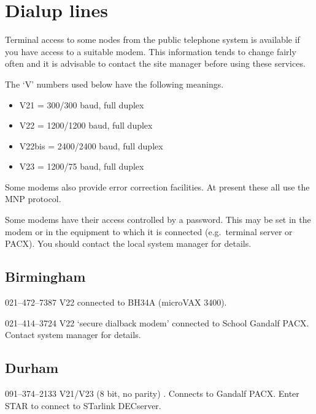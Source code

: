 \section{Dialup lines}

Terminal access to some nodes from the public telephone system is available if
you have access to a suitable modem. This information tends to change fairly
often and it is advisable to contact the site manager before using these
services.

The `V' numbers used below have the following meanings.
\begin{itemize}
\item V21 = 300/300 baud, full duplex
\item V22 = 1200/1200 baud, full duplex
\item V22bis = 2400/2400 baud, full duplex
\item V23 = 1200/75 baud, full duplex
\end{itemize}
Some modems also provide error correction facilities. At present these all use
the MNP protocol.

Some modems have their access controlled by a password. This may be set in the
modem or in the equipment to which it is connected (e.g.\ terminal server or
PACX). You should contact the local system manager for details.
\newlength{\numlen}
\settowidth{\numlen}{xxxx000--000--0000}
\settowidth{\labelsep}{000}

\subsection{Birmingham}
\begin{list}{}{\setlength{\labelwidth}{\numlen}\setlength{\leftmargin}{\numlen}
\addtolength{\leftmargin}{\labelsep}}
\item[021--472--7387] V22 connected to BH34A (microVAX 3400).
\item[021--414--3724] V22 `secure dialback modem' connected to School Gandalf
PACX. Contact system manager for details.
\end{list}

\subsection{Durham}
\begin{list}{}{\setlength{\labelwidth}{\numlen}\setlength{\leftmargin}{\numlen}
\addtolength{\leftmargin}{\labelsep}}
\item[091--374--2133] V21/V23 (8 bit, no parity) . Connects to
Gandalf PACX. Enter STAR to connect to STarlink DECserver.
\end{list}

